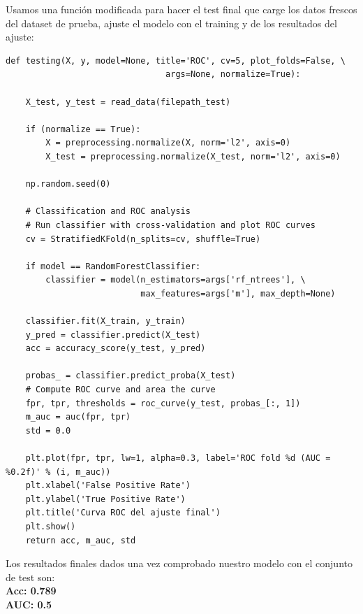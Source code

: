 \documentclass{article}
\begin{document}
Usamos una función modificada para hacer el test final que carge los datos frescos del dataset de prueba, ajuste el modelo con el training y de los resultados del ajuste:
\begin{verbatim}
def testing(X, y, model=None, title='ROC', cv=5, plot_folds=False, \
                                args=None, normalize=True):

    X_test, y_test = read_data(filepath_test)
    
    if (normalize == True):
        X = preprocessing.normalize(X, norm='l2', axis=0)
        X_test = preprocessing.normalize(X_test, norm='l2', axis=0)
        
    np.random.seed(0)
    
    # Classification and ROC analysis
    # Run classifier with cross-validation and plot ROC curves
    cv = StratifiedKFold(n_splits=cv, shuffle=True)
    
    if model == RandomForestClassifier:
        classifier = model(n_estimators=args['rf_ntrees'], \
                           max_features=args['m'], max_depth=None)
        
    classifier.fit(X_train, y_train)
    y_pred = classifier.predict(X_test)
    acc = accuracy_score(y_test, y_pred)
    
    probas_ = classifier.predict_proba(X_test)
    # Compute ROC curve and area the curve
    fpr, tpr, thresholds = roc_curve(y_test, probas_[:, 1])
    m_auc = auc(fpr, tpr)
    std = 0.0
    
    plt.plot(fpr, tpr, lw=1, alpha=0.3, label='ROC fold %d (AUC = %0.2f)' % (i, m_auc))
    plt.xlabel('False Positive Rate')
    plt.ylabel('True Positive Rate')
    plt.title('Curva ROC del ajuste final')
    plt.show()
    return acc, m_auc, std
\end{verbatim}

Los resultados finales dados una vez comprobado nuestro modelo con el conjunto de test son:
\\

\noindent \textbf{Acc: 0.789} \\
\noindent \textbf{AUC: 0.5}





\end{document}
